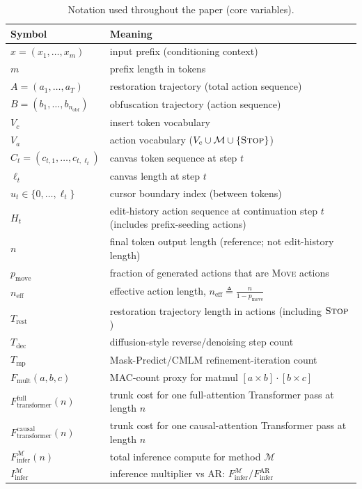 \documentclass[11pt]{article}
\DeclareRobustCommand{\ph}[1]{#1}
\DeclareRobustCommand{\phA}{A}
\DeclareRobustCommand{\ph}[1]{\ifmmode\text{\phoenicianfont #1}\else{\phoenicianfont #1}\fi}
\DeclareRobustCommand{\phA}{\ph{\char"10900}} %
\DeclareRobustCommand{\ph}[1]{#1}
\DeclareRobustCommand{\phA}{A}
\DeclareRobustCommand{\Stop}{\ifmmode\text{\textsc{Stop}}\else\textsc{Stop}\fi}
\DeclareRobustCommand{\Move}{\ifmmode\text{\textsc{Move}}\else\textsc{Move}\fi}
\newcommand{\Mset}{\mathcal{M}}
\begin{document}
\begin{table}[t]
\centering
\small
\setlength{\tabcolsep}{6pt}
\begin{tabular}{ll}
\toprule
Symbol & Meaning \\
\midrule
$x=(x_1,\dots,x_m)$ & input prefix (conditioning context) \\
$m$ & prefix length in tokens \\
$\phA=(a_1,\dots,a_T)$ & restoration trajectory (total action sequence) \\
$B=(b_1,\dots,b_{n_{\text{obf}}})$ & obfuscation trajectory (action sequence) \\
$V_c$ & insert token vocabulary \\
$V_a$ & action vocabulary ($V_c \cup \Mset \cup \{\Stop\}$) \\
$C_t=(c_{t,1},\dots,c_{t,\ell_t})$ & canvas token sequence at step $t$ \\
$\ell_t$ & canvas length at step $t$ \\
$u_t\in\{0,\dots,\ell_t\}$ & cursor boundary index (between tokens) \\
$H_t$ & edit-history action sequence at continuation step $t$ (includes prefix-seeding actions) \\
$n$ & final token output length (reference; not edit-history length) \\
$p_{\text{move}}$ & fraction of generated actions that are \Move{} actions \\
$n_{\text{eff}}$ & effective action length, $n_{\text{eff}} \triangleq \frac{n}{1-p_{\text{move}}}$ \\
$T_{\text{rest}}$ & restoration trajectory length in actions (including $\Stop$) \\
$T_{\text{dec}}$ & diffusion-style reverse/denoising step count \\
$T_{\text{mp}}$ & Mask-Predict/CMLM refinement-iteration count \\
$F_{\text{mult}}(a,b,c)$ & MAC-count proxy for matmul $[a\times b]\cdot[b\times c]$ \\
$F_{\text{transformer}}^{\text{full}}(n)$ & trunk cost for one full-attention Transformer pass at length $n$ \\
$F_{\text{transformer}}^{\text{causal}}(n)$ & trunk cost for one causal-attention Transformer pass at length $n$ \\
$F_{\text{infer}}^{\mathcal{M}}(n)$ & total inference compute for method $\mathcal{M}$ \\
$I_{\text{infer}}^{\mathcal{M}}$ & inference multiplier vs AR: $F_{\text{infer}}^{\mathcal{M}}/F_{\text{infer}}^{\text{AR}}$ \\
\bottomrule
\end{tabular}
\caption{Notation used throughout the paper (core variables).}
\label{tab:notation}
\end{table}
\end{document}
